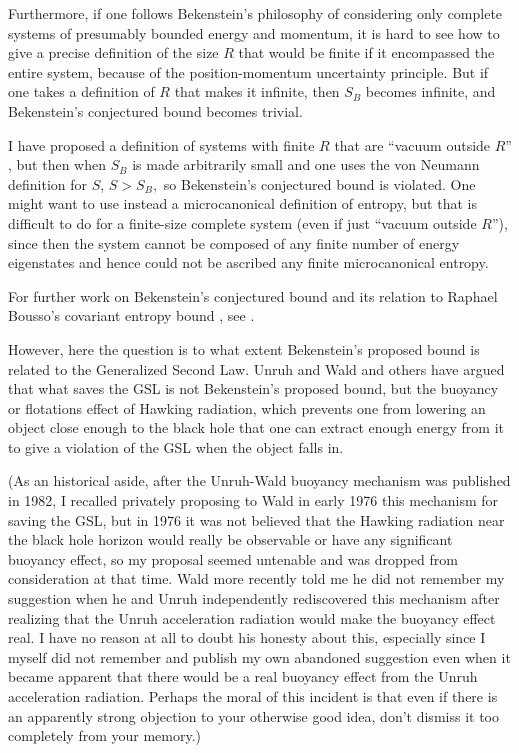 \documentclass[12pt]{article} \usepackage{latexsym} \textwidth 15cm
\begin{document}
Furthermore, if one follows Bekenstein's philosophy of considering
only complete systems of presumably bounded energy and momentum, it is
hard to see how to give a precise definition of the size $R$ that
would be finite if it encompassed the entire system, because of the
position-momentum uncertainty principle.  But if one takes a
definition of $R$ that makes it infinite, then $S_B$ becomes infinite,
and Bekenstein's conjectured bound becomes trivial.

I have proposed a definition of systems with finite $R$ that are
``vacuum outside $R$'' \cite{Page00c}, but then when $S_B$ is made
arbitrarily small and one uses the von Neumann definition for $S$, $S
> S_B,$ so Bekenstein's conjectured bound is violated.  One might want
to use instead a microcanonical definition of entropy, but that is
difficult to do for a finite-size complete system (even if just
``vacuum outside $R$''), since then the system cannot be composed of
any finite number of energy eigenstates and hence could not be
ascribed any finite microcanonical entropy.

For further work on Bekenstein's conjectured bound and its relation to
Raphael Bousso's covariant entropy bound
\cite{Bousso99,Bousso00,FMW,Bousso02,BFM}, see
\cite{Bousso01,Bousso03,Bousso04a,Bousso04b,Bousso04c}.

However, here the question is to what extent Bekenstein's proposed
bound is related to the Generalized Second Law.  Unruh and Wald and
others \cite{UW,UW2,Zas,PW} have argued that what saves the GSL is not
Bekenstein's proposed bound, but the buoyancy or flotations effect of
Hawking radiation, which prevents one from lowering an object close
enough to the black hole that one can extract enough energy from it to
give a violation of the GSL when the object falls in.

(As an historical aside, after the Unruh-Wald buoyancy mechanism was
published in 1982, I recalled privately proposing to Wald in early 1976
this mechanism for saving the GSL, but in 1976 it was not believed that
the Hawking radiation near the black hole horizon would really be
observable or have any significant buoyancy effect, so my proposal
seemed untenable and was dropped from consideration at that time. Wald
more recently told me he did not remember my suggestion when he and
Unruh independently rediscovered this mechanism after realizing that
the Unruh acceleration radiation \cite{Unracc} would make the buoyancy
effect real.  I have no reason at all to doubt his honesty about this,
especially since I myself did not remember and publish my own abandoned
suggestion even when it became apparent that there would be a real
buoyancy effect from the Unruh acceleration radiation. Perhaps the
moral of this incident is that even if there is an apparently strong
objection to your otherwise good idea, don't dismiss it too completely
from your memory.)
\end{document}
